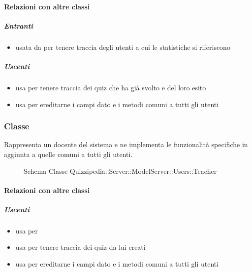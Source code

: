 \paragraph{Relazioni con altre classi}
\subparagraph{Entranti}
\begin{itemize}
\item usata da  per tenere traccia degli utenti a cui le statistiche si riferiscono
\end{itemize}
\subparagraph{Uscenti}
\begin{itemize}
\item usa  per tenere traccia dei quiz che ha già svolto e del loro esito
\item usa  per ereditarne i campi dato e i metodi comuni a tutti gli utenti
\end{itemize}
\subsubsection{Classe }
Rappresenta un docente del sistema e ne implementa le funzionalità specifiche in aggiunta a quelle comuni a tutti gli utenti.
\begin{figure}[H]
\centering
\noindent{}
\caption[Schema Classe Teacher]{Schema Classe Quizzipedia::Server::ModelServer::Users::Teacher}
\end{figure}
\paragraph{Relazioni con altre classi}
\subparagraph{Uscenti}
\begin{itemize}
\item usa  per 
\item usa  per tenere traccia dei quiz da lui creati
\item usa  per ereditarne i campi dato e i metodi comuni a tutti gli utenti
\end{itemize}
